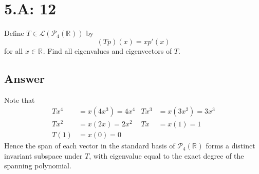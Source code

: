 \documentclass[
	12pt, %
]{fphw}
\newcommand\0{\mathbf{0}}
\newcommand\R[1]{\text{$\mathbb{R}^{#1}$}}
\newcommand\poly[1]{\text{$\mathcal{P}_{#1}(\R{})$}}
\renewcommand\L[1]{\mathcal{L}(#1)}
\begin{document}
\newpage

\section*{5.A: 12}
\begin{problem}
Define $T \in \L{\poly{4}}$ by 
$$
(Tp)(x) = xp'(x)
$$
for all $x \in \R{}$. Find all eigenvalues and eigenvectors of $T$.
\end{problem}

\subsection*{Answer} Note that
\begin{align*}
T x^4 &= x(4x^3) = 4x^4& T x^3 &= x (3x^2) = 3x^3 \\
T x^2 &= x(2x) = 2x^2  & T x &= x (1) = 1\\
T(1) &= x (0) = 0
\end{align*}
Hence the span of each vector in the standard basis of $\poly{4}$ forms a distinct invariant subspace under $T$, with eigenvalue equal to the exact degree of the spanning polynomial.
\end{document}
